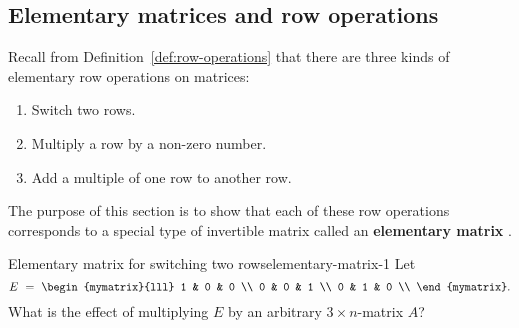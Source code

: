 \subsection{Elementary matrices and row operations}

Recall from Definition~\ref{def:row-operations} that there are three
kinds of elementary row operations%
%
%
%
 on matrices:
\begin{enumerate}
\item Switch two rows.
\item Multiply a row by a non-zero number.
\item Add a multiple of one row to another row.
\end{enumerate}
The purpose of this section is to show that each of these row
operations corresponds to a special type of invertible matrix called
an \textbf{elementary matrix}%
.

\begin{example}{Elementary matrix for switching two rows}{elementary-matrix-1}
  Let
  \begin{equation*}
    E ~=~ \begin{mymatrix}{lll}
      1 & 0 & 0 \\
      0 & 0 & 1 \\
      0 & 1 & 0 \\
    \end{mymatrix}.
  \end{equation*}
  What is the effect of multiplying $E$ by an arbitrary $3\times
  n$-matrix $A$?
\end{example}

